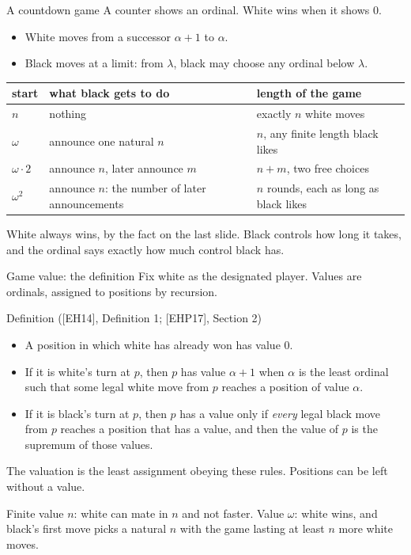 \documentclass[aspectratio=169,10pt]{beamer}
\newcommand{\EH}{[EH14]}
\newcommand{\EHP}{[EHP17]}
\begin{document}
\begin{frame}{A countdown game}
  \vskip 0.2cm
  A counter shows an ordinal. White wins when it shows $0$.
  \begin{itemize}
    \item White moves from a successor $\alpha+1$ to $\alpha$.
    \item Black moves at a limit: from $\lambda$, black may choose any ordinal below $\lambda$.
  \end{itemize}
  \vskip 0.2cm
  {\small
  \begin{tabular}{@{}lll@{}}
    \toprule
    start & what black gets to do & length of the game \\
    \midrule
    $n$ & nothing & exactly $n$ white moves \\
    $\omega$ & announce one natural $n$ & $n$, any finite length black likes \\
    $\omega\cdot 2$ & announce $n$, later announce $m$ & $n+m$, two free choices \\
    $\omega^2$ & announce $n$: the number of later announcements & $n$ rounds, each as long as black likes \\
    \bottomrule
  \end{tabular}}
  \vskip 0.2cm
  White always wins, by the fact on the last slide. Black controls how long it takes, and the ordinal
  says exactly how much control black has.
\end{frame}

\begin{frame}{Game value: the definition}
  Fix white as the designated player. Values are ordinals, assigned to positions by recursion.
  \begin{block}{Definition (\EH, Definition 1; \EHP, Section 2)}
    \begin{itemize}
      \item A position in which white has already won has value $0$.
      \item If it is white's turn at $p$, then $p$ has value $\alpha+1$ when $\alpha$ is the least ordinal such
        that some legal white move from $p$ reaches a position of value $\alpha$.
      \item If it is black's turn at $p$, then $p$ has a value only if \emph{every} legal black move from $p$
        reaches a position that has a value, and then the value of $p$ is the supremum of those values.
    \end{itemize}
    The valuation is the least assignment obeying these rules. Positions can be left without a value.
  \end{block}
  \vskip 0.2cm
  Finite value $n$: white can mate in $n$ and not faster. Value $\omega$: white wins, and black's first move
  picks a natural $n$ with the game lasting at least $n$ more white moves.
\end{frame}
\end{document}
